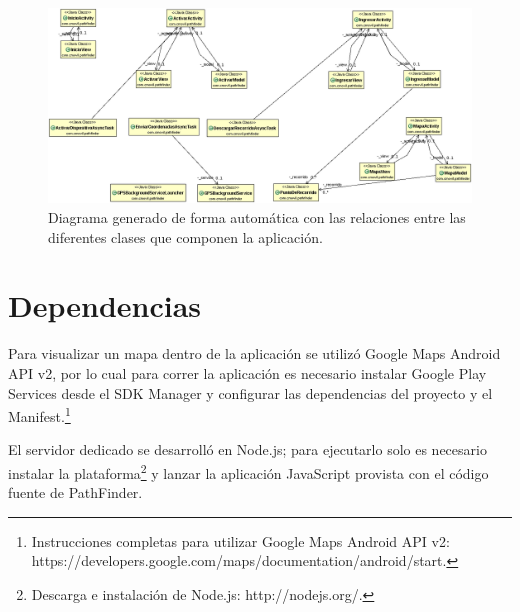 \documentclass[a4paper]{article}
\begin{document}
\begin{figure}[h]
\begin{center}
  \includegraphics[scale=0.4]{imagenes/UML.png}
\end{center}
\caption{Diagrama generado de forma automática con las relaciones entre las diferentes clases que componen la aplicación.}
\label{fig:uml}
\end{figure}

\newpage
\section{Dependencias}

Para visualizar un mapa dentro de la aplicación se utilizó Google Maps Android API v2, por lo cual para correr la aplicación es necesario instalar Google Play Services desde el SDK Manager y configurar las dependencias del proyecto y el Manifest.\footnote{Instrucciones completas para utilizar Google Maps Android API v2: https://developers.google.com/maps/documentation/android/start.}
\vspace*{2mm}

El servidor dedicado se desarrolló en Node.js; para ejecutarlo solo es necesario instalar la plataforma\footnote{Descarga e instalación de Node.js: http://nodejs.org/.} y lanzar la aplicación JavaScript provista con el código fuente de PathFinder.
\end{document}
